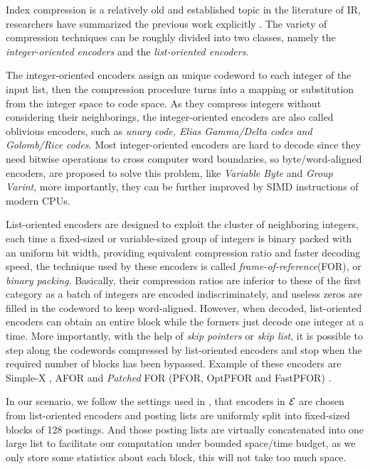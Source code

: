 \documentclass{sig-alternate-05-2015}
\begin{document}
Index compression is a relatively old and established topic in the literature of IR, researchers have summarized the previous work explicitly \cite{catena2014inverted,lemire2015decoding,silvestri2010vsencoding,trotman2014compression}.
The variety of compression techniques can be roughly divided into two classes, namely the \textit{integer-oriented encoders} and the \textit{list-oriented encoders}.

The integer-oriented encoders assign an unique codeword to each integer of the input list, then the compression procedure turns into a mapping or substitution from the integer space to code space.
As they compress integers without considering their neighborings, the integer-oriented encoders are also called oblivious encoders\cite{catena2014inverted}, such as \textit{unary code, Elias Gamma/Delta codes \emph{and} Golomb/Rice codes}.
Most integer-oriented encoders are hard to decode since they need bitwise operations to cross computer word boundaries, so byte/word-aligned encoders, are proposed to solve this problem, like \textit{Variable Byte} and \textit{Group Varint}, more importantly, they can be further improved by SIMD instructions of modern CPUs\cite{stepanov2011simd,trotman2014compression}.

List-oriented encoders are designed to exploit the cluster of neighboring integers, each time a fixed-sized or variable-sized group of integers is binary packed with an uniform bit width, providing equivalent compression ratio and faster decoding speed, the technique used by these encoders is called \textit{frame-of-reference}(FOR), or \textit{binary packing}\cite{delbru2010adaptive,goldstein1998compressing}.
Basically, their compression ratios are inferior to these of the first category as a batch of integers are encoded indiscriminately, and useless zeros are filled in the codeword to keep word-aligned.
However, when decoded, list-oriented encoders can obtain an entire block while the formers just decode one integer at a time.
More importantly, with the help of \textit{skip pointers} or \textit{skip list}, it is possible to step along the codewords compressed by list-oriented encoders and stop when the required number of blocks has been bypassed.
Example of these encoders are Simple-X \cite{anh2004index,anh2005inverted,anh2006improved,anh2010index}, AFOR \cite{delbru2012searching} and \textit{Patched} FOR (PFOR, OptPFOR and FastPFOR) \cite{lemire2015decoding,yan2009inverted,zukowski2006super}.

In our scenario, we follow the settings used in \cite{ottaviano2015optimal}, that encoders in $ \cal E $ are chosen from list-oriented encoders and posting lists are uniformly split into fixed-sized blocks of 128 postings.
And those posting lists are virtually concatenated into one large list to facilitate our computation under bounded space/time budget, as we only store some statistics about each block, this will not take too much space.
\end{document}
